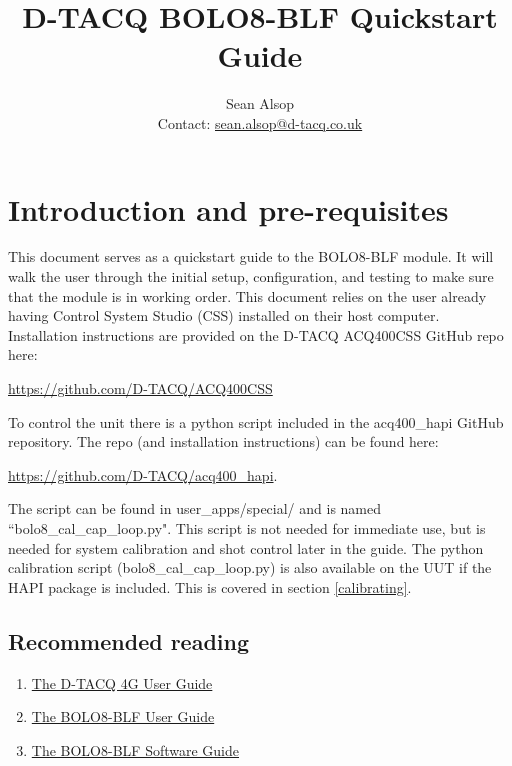 \documentclass{article}
\begin{document}
\title{D-TACQ BOLO8-BLF Quickstart Guide}
\author{Sean Alsop \\ Contact: \href{mailto:sean.alsop@d-tacq.co.uk}{sean.alsop@d-tacq.co.uk} }

\maketitle


\tableofcontents

\section{Introduction and pre-requisites}
This document serves as a quickstart guide to the BOLO8-BLF module.
It will walk the user through the initial setup, configuration, and testing to make sure that the module is in working order.
This document relies on the user already having Control System Studio (CSS) installed on their host computer.
Installation instructions are provided on the D-TACQ ACQ400CSS GitHub repo here:
\newline
\centerline{ \href{https://github.com/D-TACQ/ACQ400CSS}{https://github.com/D-TACQ/ACQ400CSS} }
\newline
To control the unit there is a python script included in the acq400\_hapi GitHub repository.
The repo (and installation instructions) can be found here:
\newline
\centerline{ \href{https://github.com/D-TACQ/acq400_hapi}{https://github.com/D-TACQ/acq400\_hapi}. }
\newline
The script can be found in user\_apps/special/ and is named ``bolo8\_cal\_cap\_loop.py".
This script is not needed for immediate use, but is needed for system calibration and shot control later in the guide.
The python calibration script (bolo8\_cal\_cap\_loop.py) is also available on the UUT if the HAPI package is included.
This is covered in section \ref{calibrating}.

\subsection{Recommended reading}
\begin{enumerate}
	\item \href{http://www.d-tacq.com/resources/d-tacq-4G-acq4xx-UserGuide-r28.pdf}{The D-TACQ 4G User Guide}
	\item \href{http://www.d-tacq.com/resources/Bolo_calibration_report_user-guide.pdf}{The BOLO8-BLF User Guide}
	\item \href{https://github.com/seanalsop/bolodsp-doc/releases}{The BOLO8-BLF Software Guide}
\end{enumerate}
\end{document}
